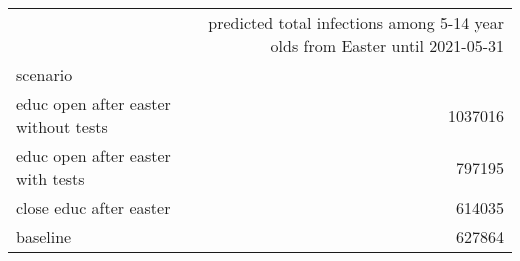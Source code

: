 \begin{tabular}{lr}
\toprule
{} &  predicted total infections among 5-14 year olds from Easter until 2021-05-31 \\
scenario                               &                                                                               \\
\midrule
 educ open after easter  without tests &                                            1037016 \\
 educ open after easter  with tests    &                                             797195 \\
 close educ after easter               &                                             614035 \\
 baseline                              &                                             627864 \\
\bottomrule
\end{tabular}
